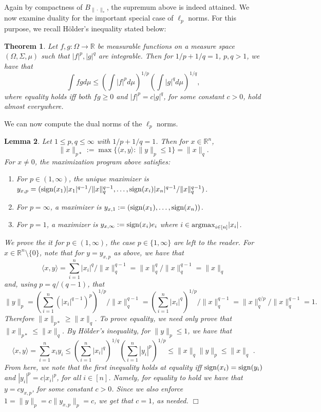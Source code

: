 \documentclass[11pt]{article}
\newtheorem{theorem}{Theorem}
\newtheorem{lemma}[theorem]{Lemma}
\theoremstyle{plain}
\newenvironment{proof}{\noindent {\sc Proof:}}{$\Box$ \medskip}
\theoremstyle{plain}
\newcommand{\set}[1]{\{{#1}\}}
\newcommand{\R}{\ensuremath{\mathbb{R}}}
\newcommand{\pr}[2]{\langle{#1, #2}\rangle}
\begin{document}
Again by compactness of $B_{\|\cdot\|_*}$, the supremum above is indeed
attained. We now examine duality for the important special case of $\ell_p$
norms. For this purpose, we recall H{\"o}lder's inequality stated below:

\begin{theorem} Let $f,g: \Omega \rightarrow \R$ be measurable functions on a
measure space $(\Omega,\Sigma,\mu)$ such that $|f|^p, |g|^q$ are integrable.
Then for $1/p+1/q = 1$, $p,q > 1$, we have that
\[
\int f g d\mu \leq (\int |f|^p d\mu)^{1/p} (\int |g|^q d\mu)^{1/q},
\]
where equality holds iff both $fg \geq 0$ and $|f|^p = c |g|^q$, for some
constant $c > 0$, hold almost everywhere. 
\end{theorem}

We can now compute the dual norms of the $\ell_p$ norms.

\begin{lemma} Let $1 \leq p,q \leq \infty$ with $1/p + 1/q = 1$. Then for $x \in
\R^n$,
\[
\|x\|_{p*} := \max \set{\pr{x}{y}: \|y\|_p \leq 1} = \|x\|_q .
\]
For $x \neq 0$, the maximization program above satisfies:
\begin{enumerate}
\item For $p \in (1,\infty)$, the unique maximizer is
$y_{x,p} = ({\rm sign}(x_1) |x_1|^{q-1}/\|x\|_q^{q-1}, \dots,{\rm sign}(x_i)
|x_n|^{q-1}/\|x\|_q^{q-1})$. 
\item For $p = \infty$, a maximizer is $y_{x,1} := ({\rm sign}(x_1),\dots,{\rm
sign}(x_n))$. 
\item For $p = 1$, a maximizer is $y_{x,\infty} := {\rm sign}(x_i) e_i$
where $i \in {\rm argmax}_{i \in [n]} |x_i|$. 
\end{enumerate}
\label{lem:dual-lp-norm}
\begin{proof}
We prove the it for $p \in (1,\infty)$, the case $p \in \set{1,\infty}$ are left
to the reader. For $x \in \R^n \setminus \set{0}$, note that for $y =
y_{x,p}$ as above, we have that
\[
\pr{x}{y} = \sum_{i=1}^n |x_i|^q/\|x\|_q^{q-1} = \|x\|_q^q/\|x\|_q^{q-1} =
\|x\|_q
\]
and, using $p = q/(q-1)$, that
\[
\|y\|_p = (\sum_{i=1}^n (|x_i|^{q-1})^p)^{1/p} / \|x\|_q^{q-1} 
        = (\sum_{i=1}^n |x_i|^q)^{1/p} / \|x\|_q^{q-1} =
\|x\|_q^{q/p}/\|x\|_q^{q-1} = 1.
\]
Therefore $\|x\|_{p*} \geq \|x\|_q$. To prove equality, we need only prove that
$\|x\|_{p*} \leq \|x\|_q$. By H{\"o}lder's inequality, for $\|y\|_p \leq 1$, we
have that
\[
\pr{x}{y} = \sum_{i=1}^n x_i y_i \leq (\sum_{i=1}^n |x_i|^q)^{1/q}(\sum_{i=1}^n
|y_i|^p)^{1/p} \leq \|x\|_q \|y\|_p \leq \|x\|_q \text{ .}
\]
From here, we note that the first inequality holds at equality iff ${\rm
sign}(x_i) = {\rm sign}(y_i)$ and $|y_i|^p = c |x_i|^p$, for all $i \in [n]$.
Namely, for equality to hold we have that $y = c y_{x,p}$, for some constant $c
> 0$. Since we also enforce $1 = \|y\|_p = c \|y_{x,p}\|_p = c$, we get that
$c=1$, as needed.
\end{proof}

\end{lemma}
\end{document}
